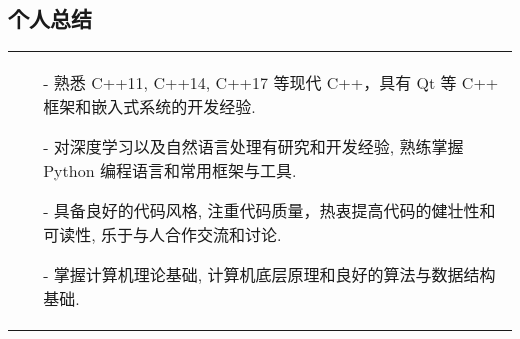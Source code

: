 \documentclass[a4paper,12pt]{article}
\begin{document}
\begin{CJK}{UTF8}{gbsn}
\section{个人总结}
\begin{tabularx}{\linewidth}{ X@{}  }
\begin{minipage}[t]{\linewidth}
    \begin{itemize}[nosep,after=\strut, leftmargin=1em, itemsep=3pt]
        \item[-] 熟悉 C++11, C++14, C++17 等现代 C++，具有 Qt 等 C++ 框架和嵌入式系统的开发经验.
        \item[-] 对深度学习以及自然语言处理有研究和开发经验, 熟练掌握 Python 编程语言和常用框架与工具.
        \item[-] 具备良好的代码风格, 注重代码质量，热衷提高代码的健壮性和可读性, 乐于与人合作交流和讨论.
        \item[-] 掌握计算机理论基础, 计算机底层原理和良好的算法与数据结构基础.
    \end{itemize}
\end{minipage}
\end{tabularx}
\end{CJK}
\end{document}
